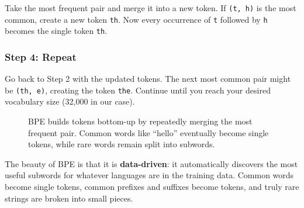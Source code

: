 \documentclass[11pt,a4paper]{article}
\begin{document}
Take the most frequent pair and merge it into a new token. If \texttt{(t, h)} is the most common, create a new token \texttt{th}. Now every occurrence of \texttt{t} followed by \texttt{h} becomes the single token \texttt{th}.

\subsubsection{Step 4: Repeat}

Go back to Step 2 with the updated tokens. The next most common pair might be \texttt{(th, e)}, creating the token \texttt{the}. Continue until you reach your desired vocabulary size (32,000 in our case).

\begin{figure}[H]
\centering
{}
\caption{BPE builds tokens bottom-up by repeatedly merging the most frequent pair. Common words like ``hello'' eventually become single tokens, while rare words remain split into subwords.}
\label{fig:bpe}
\end{figure}

The beauty of BPE is that it is \textbf{data-driven}: it automatically discovers the most useful subwords for whatever languages are in the training data. Common words become single tokens, common prefixes and suffixes become tokens, and truly rare strings are broken into small pieces.
\end{document}
